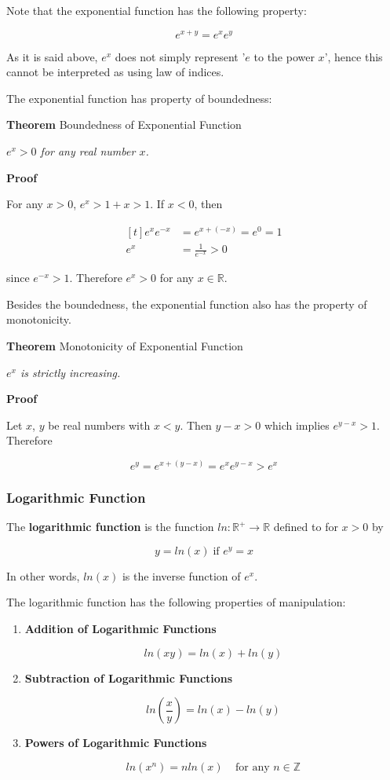 \documentclass[a4paper,12pt]{article}
\newcommand{\s}{\vspace{1mm}}
\newcommand{\n}{\vspace{3mm}}
\newcommand{\R}{\mathbb{R}}
\newcommand{\Z}{\mathbb{Z}}
\newenvironment{block}[4][Block]{ %
\begin{list}{}{
  \setlength{\leftmargin}{0mm}
  \setlength{\rightmargin}{0mm}
  \setlength{\topsep}{0mm}
  \setlength{\partopsep}{0mm}
  \parsep\parskip
  \setlength{\itemsep}{-\parsep}
  }
  \needspace{\baselineskip}
  \item \textbf{#2 #3} \hspace{1mm} #4
  \vspace{1mm}
  \item
  }
{
\end{list}
}
\newenvironment{alist}{ %
\begin{enumerate}[label=(\alph*)]
}{
\end{enumerate}
}
\begin{document}
Note that the exponential function has the following property:

$$e^{x+y}=e^{x}e^{y}$$\s

As it is said above, $e^{x}$ does not simply represent '$e$ to the power $x$', hence this cannot be interpreted as using law of indices.\n

The exponential function has property of boundedness:\n

\begin{block}{Theorem}{}{Boundedness of Exponential Function}
  \textit{$e^{x}>0$ for any real number $x$.}
\end{block}\n

\begin{block}{Proof}{}{}
  For any $x>0$, $e^{x}>1+x>1$. If $x<0$, then

  $$\begin{aligned}[t]
    e^{x}e^{-x}&=e^{x+(-x)}=e^{0}=1\\
    e^{x}&=\frac{1}{e^{-x}}>0
  \end{aligned}$$\s

  since $e^{-x}>1$. Therefore $e^{x}>0$ for any $x\in \R$.
\end{block}\n

Besides the boundedness, the exponential function also has the property of monotonicity.\n

\begin{block}{Theorem}{}{Monotonicity of Exponential Function}
  \textit{$e^{x}$ is strictly increasing.}
\end{block}\n

\begin{block}{Proof}{}{}
  Let $x$, $y$ be real numbers with $x<y$. Then $y-x>0$ which implies $e^{y-x}>1$. Therefore

  $$e^{y}=e^{x+(y-x)}=e^{x}e^{y-x}>e^{x}$$
\end{block}

\subsubsection{Logarithmic Function}
The \textbf{logarithmic function} is the function $ln: \R^{+}\to \R$ defined to for $x>0$ by

$$y=ln(x)\;\text{if }e^{y}=x$$\s

In other words, $ln(x)$ is the inverse function of $e^{x}$.\n

The logarithmic function has the following properties of manipulation:

\begin{alist}
  \item \textbf{Addition of Logarithmic Functions}

  $$ln(xy)=ln(x)+ln(y)$$

  \item \textbf{Subtraction of Logarithmic Functions}

  $$ln\left(\frac{x}{y}\right)=ln(x)-ln(y)$$

  \item \textbf{Powers of Logarithmic Functions}

  $$ln(x^{n})=nln(x)\;\;\;\;\text{for any }n\in \Z$$
\end{alist}
\end{document}
